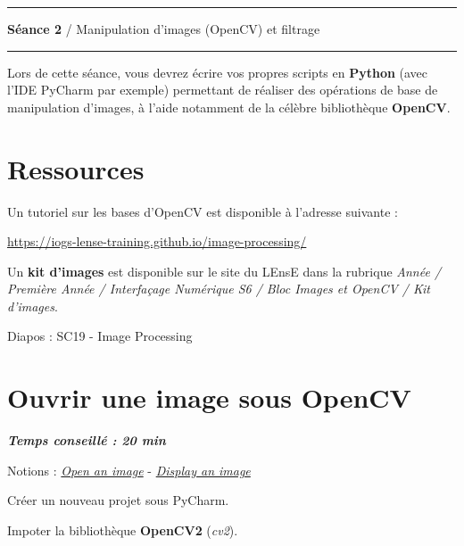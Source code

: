 \documentclass[a4paper,11pt,titlepage]{article} %
\begin{document}
\vspace{0.5cm}

\noindent \rule{\linewidth}{1pt}

{\noindent\Large \rule[-7pt]{0pt}{30pt} \textbf{Séance 2} / Manipulation d'images (OpenCV) et filtrage} 

\noindent \rule{\linewidth}{1pt}

Lors de cette séance, vous devrez écrire vos propres scripts en \textbf{Python} (avec l'IDE PyCharm par exemple) permettant de réaliser des opérations de base de manipulation d'images, à l'aide notamment de la célèbre bibliothèque \textbf{OpenCV}.

\section{Ressources}

Un tutoriel sur les bases d'OpenCV est disponible à l’adresse suivante : 

\href{https://iogs-lense-training.github.io/image-processing/}{https://iogs-lense-training.github.io/image-processing/}

Un \textbf{kit d'images} est disponible sur le site du LEnsE dans la rubrique \textit{Année / Première Année / Interfaçage Numérique S6 / Bloc Images et OpenCV / Kit d'images}. 


Diapos : SC19 - Image Processing


\section{Ouvrir une image sous OpenCV}

\begin{center} \textbf{\textit{Temps conseillé : 20 min}} \end{center}

\begin{mdframed}[style=sidebar,frametitle={}]
Notions : \href{https://iogs-lense-training.github.io/image-processing/contents/opencv.html#open-an-image
}{\textit{Open an image}} - \href{https://iogs-lense-training.github.io/image-processing/contents/opencv.html#display-an-image
}{\textit{Display an image}}
\end{mdframed}

\Manip Créer un nouveau projet sous PyCharm.

\Manip Impoter la bibliothèque \textbf{OpenCV2} (\textit{cv2}).

\medskip
\end{document}
